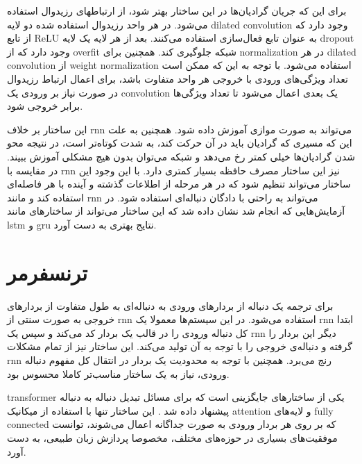 برای این که جریان گرادیان‌ها در این ساختار بهتر شود، از ارتباطهای رزیدوال
استفاده می‌شود. در هر واحد رزیدوال استفاده شده دو لایه \gls{dilated convolution}
وجود دارد که از تابع ReLU به عنوان تابع فعال‌سازی استفاده می‌کنند. بعد از هر
لایه یک لایه dropout وجود دارد که از \gls{overfit} شبکه جلوگیری کند. همچنین برای
\gls{normalization} در هر \gls{dilated convolution} از \gls{weight
normalization} استفاده می‌شود. با توجه به این که ممکن است تعداد ویژگی‌های ورودی
با خروجی هر واحد متفاوت باشد، برای اعمال ارتباط رزیدوال در صورت نیاز بر ورودی یک
\gls{convolution} یک بعدی اعمال می‌شود تا تعداد ویژگی‌ها برابر خروجی شود.

این ساختار بر خلاف \gls{rnn} می‌تواند به صورت موازی آموزش داده شود. همچنین به
علت این که مسیری که گرادیان باید در آن حرکت کند، به شدت کوتاه‌تر است، در نتیجه
محو شدن گرادیان‌ها خیلی کمتر رخ می‌دهد و شبکه می‌توان بدون هیچ مشکلی آموزش
ببیند. در مقایسه با \gls{rnn} نیز این ساختار مصرف حافظه بسیار کمتری دارد. با این
وجود این ساختار می‌تواند تنظیم شود که در هر مرحله از اطلاعات گذشته و آینده با هر
فاصله‌ای استفاده کند و مانند \gls{rnn} می‌تواند به راحتی با دادگان دنباله‌ای
استفاده شود. در آزمایش‌هایی که انجام شد \cite{bai2018empirical} نشان داده شد که
این ساختار می‌تواند از ساختارهای مانند \gls{lstm} و \gls{gru} نتایج بهتری به دست
آورد.

\section{ترنسفرمر}
برای ترجمه یک دنباله از بردارهای ورودی به دنباله‌ای به طول متفاوت از بردارهای
خروجی به صورت سنتی از \gls{rnn} استفاده می‌شود. در این سیستم‌ها معمولا یک
\gls{rnn} ابتدا کل دنباله ورودی را در قالب یک بردار کد می‌کند و سپس یک \gls{rnn}
دیگر این بردار را گرفته و دنباله‌ی خروجی را با توجه به آن تولید می‌کند. این
ساختار نیز از تمام مشکلات \gls{rnn} رنج می‌برد. همچنین با توجه به محدودیت یک
بردار در انتقال کل مفهوم دنباله ورودی، نیاز به یک ساختار مناسب‌تر کاملا محسوس
بود.

\gls{transformer} یکی از ساختارهای جایگزینی است که برای مسائل تبدیل دنباله به
دنباله پیشنهاد داده شد \cite{vaswani2017attention}. این ساختار تنها با استفاده
از میکانیک \gls{attention} و لایه‌های \gls{fully connected} که بر روی هر بردار
ورودی به صورت جداگانه اعمال می‌شوند، توانست موفقیت‌های بسیاری در حوزه‌های مختلف،
مخصوصا پردازش زبان طبیعی، به دست آورد.

